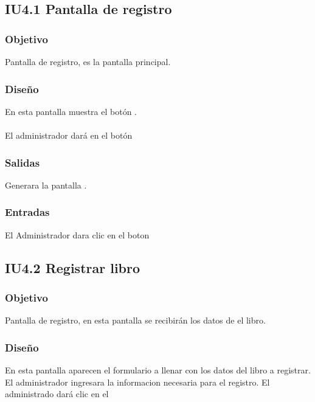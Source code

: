 \newpage
\subsection{IU4.1 Pantalla de registro}

\subsubsection{Objetivo}
	Pantalla de registro, es la pantalla principal.  

\subsubsection{Diseño}
	En esta pantalla muestra el botón .  \\\\
	El administrador dará en el botón 


\subsubsection{Salidas}
	\begin{Citemize}
		\item Generara la pantalla . 
	\end{Citemize}
	
\subsubsection{Entradas}
	\begin{Citemize}
		\item El Administrador dara clic en el boton \IUbutton{Registrar}
	\end{Citemize}

\subsection{IU4.2 Registrar libro}

\subsubsection{Objetivo}
	Pantalla de registro, en esta pantalla se recibirán los datos de el libro.

\subsubsection{Diseño}
	En esta pantalla aparecen el formulario a llenar con los datos del libro a registrar.
	El administrador ingresara la informacion necesaria para el registro.
	El administrado dará clic en el 

